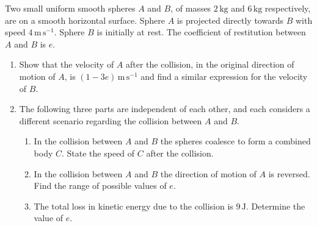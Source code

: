 \documentclass[leqno]{article}
\begin{document}
\begin{enumerate}[
  label=\textbf{\arabic*.},
  leftmargin=*,
  topsep=0pt,
  partopsep=0pt,
  parsep=0pt
]
Two small uniform smooth spheres $A$ and $B$, of masses $2\,\mathrm{kg}$ and $6\,\mathrm{kg}$ respectively, are on a smooth horizontal surface. Sphere $A$ is projected directly towards $B$ with speed $4\,\mathrm{m}\,\mathrm{s}^{-1}$. Sphere $B$ is initially at rest. The coefficient of restitution between $A$ and $B$ is $e$. \\
\begin{enumerate}[label=\textbf{(\alph*)}]
  \item Show that the velocity of $A$ after the collision, in the original direction of motion of $A$, is $(1-3e)\,\mathrm{m}\,\mathrm{s}^{-1}$ and find a similar expression for the velocity of $B$.  \\
  \item The following three parts are independent of each other, and each considers a different scenario regarding the collision between $A$ and $B$. \\
  \begin{enumerate}[label=(\roman*)]
    \item In the collision between $A$ and $B$ the spheres coalesce to form a combined body $C$. State the speed of $C$ after the collision. 
    \item In the collision between $A$ and $B$ the direction of motion of $A$ is reversed. Find the range of possible values of $e$. 
    \item The total loss in kinetic energy due to the collision is $9\,\mathrm{J}$. Determine the value of $e$.  \\
  \end{enumerate}
\end{enumerate}

\newpage


\questionitem

\begin{figure}[H]
    \centering
{}
\end{figure}



\end{enumerate}
\end{document}

